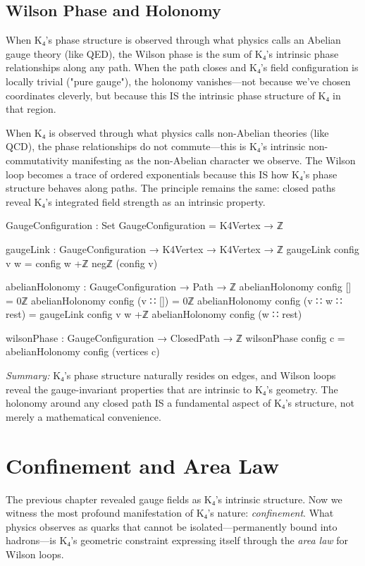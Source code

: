 \documentclass[11pt,a4paper]{book}
\begin{document}
\section{Wilson Phase and Holonomy}

When K₄'s phase structure is observed through what physics calls an Abelian gauge theory (like QED), the Wilson phase is the sum of K₄'s intrinsic phase relationships along any path. When the path closes and K₄'s field configuration is locally trivial ("pure gauge"), the holonomy vanishes—not because we've chosen coordinates cleverly, but because this IS the intrinsic phase structure of K₄ in that region.

When K₄ is observed through what physics calls non-Abelian theories (like QCD), the phase relationships do not commute—this is K₄'s intrinsic non-commutativity manifesting as the non-Abelian character we observe. The Wilson loop becomes a trace of ordered exponentials because this IS how K₄'s phase structure behaves along paths. The principle remains the same: closed paths reveal K₄'s integrated field strength as an intrinsic property.

\begin{code}
GaugeConfiguration : Set
GaugeConfiguration = K4Vertex → ℤ

gaugeLink : GaugeConfiguration → K4Vertex → K4Vertex → ℤ
gaugeLink config v w = config w +ℤ negℤ (config v)

abelianHolonomy : GaugeConfiguration → Path → ℤ
abelianHolonomy config [] = 0ℤ
abelianHolonomy config (v ∷ []) = 0ℤ
abelianHolonomy config (v ∷ w ∷ rest) = 
  gaugeLink config v w +ℤ abelianHolonomy config (w ∷ rest)

wilsonPhase : GaugeConfiguration → ClosedPath → ℤ
wilsonPhase config c = abelianHolonomy config (vertices c)
\end{code}

\medskip
\noindent\textit{Summary:} K₄'s phase structure naturally resides on edges, and Wilson loops reveal the gauge-invariant properties that are intrinsic to K₄'s geometry. The holonomy around any closed path IS a fundamental aspect of K₄'s structure, not merely a mathematical convenience.

\chapter{Confinement and Area Law}
\label{chap:confinement}

The previous chapter revealed gauge fields as K₄'s intrinsic structure. Now we witness the most profound manifestation of K₄'s nature: \emph{confinement}. What physics observes as quarks that cannot be isolated—permanently bound into hadrons—is K₄'s geometric constraint expressing itself through the \emph{area law} for Wilson loops.
\end{document}
